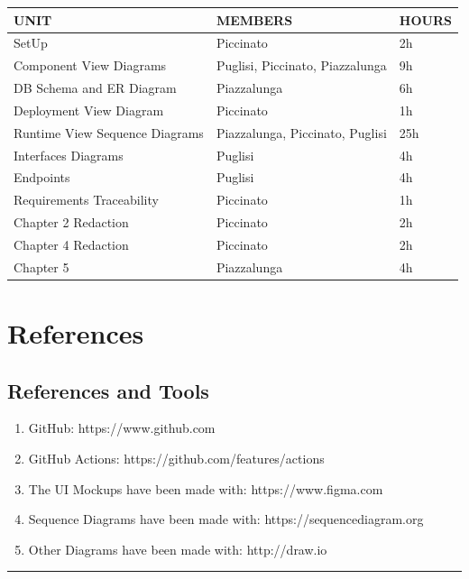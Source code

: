 \documentclass{Configuration_Files/Template}
\begin{document}
\begin{table}[h]
\centering
\begin{tabularx}{\textwidth}{| X | X | X |}
\hline
\textbf{UNIT} & \textbf{MEMBERS} & \textbf{HOURS} \\ [1ex]
\hline
SetUp & Piccinato & 2h \\ [1ex]
\hline
Component View Diagrams & Puglisi, Piccinato, Piazzalunga & 9h \\ [1ex]
\hline
DB Schema and ER Diagram & Piazzalunga & 6h \\ [1ex]
\hline
Deployment View Diagram & Piccinato & 1h \\ [1ex]
\hline
Runtime View Sequence Diagrams & Piazzalunga, Piccinato, Puglisi & 25h \\ [1ex]
\hline
Interfaces Diagrams & Puglisi & 4h \\ [1ex]
\hline
Endpoints & Puglisi & 4h \\ [1ex]
\hline
Requirements Traceability & Piccinato & 1h \\ [1ex]
\hline
Chapter 2 Redaction & Piccinato & 2h \\ [1ex]
\hline
Chapter 4 Redaction & Piccinato & 2h \\ [1ex]
\hline
Chapter 5 & Piazzalunga & 4h \\ [1ex]

\hline
\end{tabularx}
\end{table}

\chapter{References}

\section{References and Tools}

\begin{enumerate}
    \item GitHub: https://www.github.com
    \item GitHub Actions: https://github.com/features/actions
    \item The UI Mockups have been made with: https://www.figma.com
    \item Sequence Diagrams have been made with: https://sequencediagram.org
    \item Other Diagrams have been made with: http://draw.io
\end{enumerate}

{\color{bluepoli}\rule{\linewidth}{0.1pt}}
\end{document}
